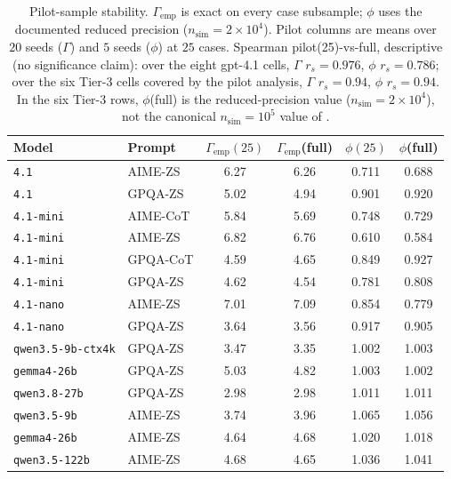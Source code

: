 \documentclass[a4paper,fleqn]{cas-sc}
\newcommand{\agreementIndex}{\Gamma}
\begin{document}
\begin{table}[t]\begin{minipage}{\linewidth}
\centering
\caption{Pilot-sample stability. $\agreementIndex_{\mathrm{emp}}$ is exact on every
case subsample; $\phi$ uses the documented reduced precision
($n_{\mathrm{sim}}=2\times10^4$). Pilot columns are means over $20$
seeds ($\agreementIndex$) and $5$ seeds ($\phi$) at $25$ cases. Spearman
pilot(25)-vs-full, descriptive (no significance claim): over the eight
gpt-4.1 cells, $\agreementIndex$ $r_s=0.976$, $\phi$ $r_s=0.786$; over the six
Tier-3 cells covered by the pilot analysis, $\agreementIndex$ $r_s=0.94$, $\phi$
$r_s=0.94$. In the six Tier-3 rows, $\phi$(full) is the reduced-precision value
($n_{\mathrm{sim}}=2\times10^4$), not the canonical
$n_{\mathrm{sim}}=10^5$ value of .}
\label{tab:pilot}
\begin{tabular}{llcccc}
\toprule
Model & Prompt & $\agreementIndex_{\mathrm{emp}}(25)$ & $\agreementIndex_{\mathrm{emp}}$(full) & $\phi(25)$ & $\phi$(full) \\
\midrule
\texttt{4.1} & AIME-ZS & 6.27 & 6.26 & 0.711 & 0.688 \\
\texttt{4.1} & GPQA-ZS & 5.02 & 4.94 & 0.901 & 0.920 \\
\texttt{4.1-mini} & AIME-CoT & 5.84 & 5.69 & 0.748 & 0.729 \\
\texttt{4.1-mini} & AIME-ZS & 6.82 & 6.76 & 0.610 & 0.584 \\
\texttt{4.1-mini} & GPQA-CoT & 4.59 & 4.65 & 0.849 & 0.927 \\
\texttt{4.1-mini} & GPQA-ZS & 4.62 & 4.54 & 0.781 & 0.808 \\
\texttt{4.1-nano} & AIME-ZS & 7.01 & 7.09 & 0.854 & 0.779 \\
\texttt{4.1-nano} & GPQA-ZS & 3.64 & 3.56 & 0.917 & 0.905 \\
\midrule
\texttt{qwen3.5-9b-ctx4k} & GPQA-ZS & 3.47 & 3.35 & 1.002 & 1.003 \\
\texttt{gemma4-26b} & GPQA-ZS & 5.03 & 4.82 & 1.003 & 1.002 \\
\texttt{qwen3.8-27b} & GPQA-ZS & 2.98 & 2.98 & 1.011 & 1.011 \\
\texttt{qwen3.5-9b} & AIME-ZS & 3.74 & 3.96 & 1.065 & 1.056 \\
\texttt{gemma4-26b} & AIME-ZS & 4.64 & 4.68 & 1.020 & 1.018 \\
\texttt{qwen3.5-122b} & AIME-ZS & 4.68 & 4.65 & 1.036 & 1.041 \\
\bottomrule
\end{tabular}
\end{minipage}\end{table}
\end{document}

